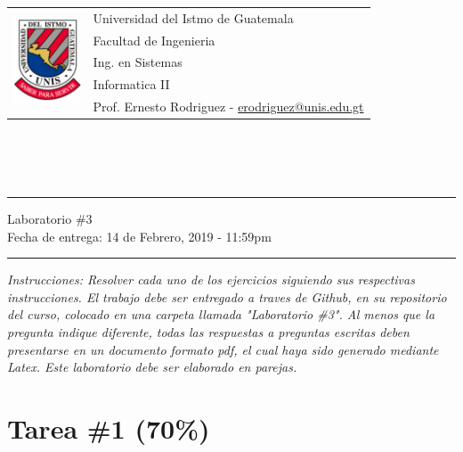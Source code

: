 \documentclass{article}
\newcommand{\horrule}[1]{\rule{\linewidth}{#1}}
\begin{document}
\begin{tabular}{l l}
\multirow{5}{*}{\includegraphics[width=2cm]{../../recursos/logo.png}} & Universidad del Istmo de Guatemala \\
 & Facultad de Ingenieria \\
 & Ing. en Sistemas \\
 & Informatica II \\
 & Prof. Ernesto Rodriguez - \href{mailto:erodriguez@unis.edu.gt}{erodriguez@unis.edu.gt} \\
\end{tabular}
\\\\\\

\begin{center}
        \horrule{0.5pt}
        \huge{Laboratorio \#3} \\
        \large{Fecha de entrega: 14 de Febrero, 2019 - 11:59pm} \\
        \horrule{1pt}
\end{center}

\emph{Instrucciones: Resolver cada uno de los ejercicios siguiendo sus respectivas
instrucciones. El trabajo debe ser entregado a traves de Github, en su repositorio del curso, colocado en una carpeta llamada "Laboratorio \#3".
Al menos que la pregunta indique diferente, todas las respuestas a preguntas escritas deben presentarse en
un documento formato pdf, el cual haya sido generado mediante Latex. Este laboratorio
debe ser elaborado en parejas.}

\section*{Tarea \#1 (70\%)}
\end{document}
